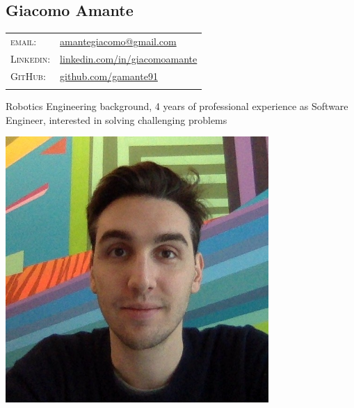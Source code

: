 \documentclass[a4paper,10pt]{article}
\begin{document}
   \pagestyle{empty}

   \begin{minipage}{0.75\textwidth}
      \vspace{-10mm}
      \begin{flushleft}
         \section{\Huge Giacomo Amante}
         \vspace{2mm}
         \begin{tabular}{ll}
            \textsc{email:} & \href{mailto:amantegiacomo@gmail.com}{amantegiacomo@gmail.com} \\
            \textsc{Linkedin:} & 
            \href{http://www.linkedin.com/in/giacomoamante}{\color{black}linkedin.com/in/giacomoamante}\\
            \textsc{GitHub:} & \href{https://github.com/gamante91}{github.com/gamante91}\\
            \multicolumn{2}{c}{} \\
         \end{tabular}
      \end{flushleft}
      Robotics Engineering background, 4 years of professional experience as Software Engineer, interested in solving challenging problems
   \end{minipage}
   \begin{minipage}[c]{0.25\textwidth}
      \begin{center}
         \includegraphics[width=0.75\textwidth]{resources/GiacomoAmante_lowres.jpg}
      \end{center}
   \end{minipage}
\end{document}
